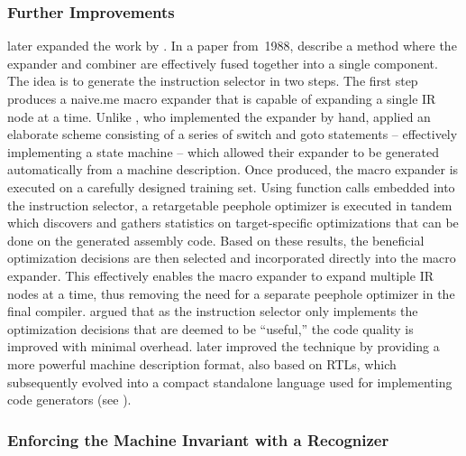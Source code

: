 \subsubsection{Further Improvements}

\textcite{FraserWendt:1988} later expanded the work by
\citeauthor{DavidsonFraser:1984}.
%
In a paper from~1988, \citeauthor{FraserWendt:1988} describe a method where the
\gls{expander} and \gls{combiner} are effectively fused together into a single
component.
%
The idea is to generate the \gls{instruction selector} in two steps.
%
The first step produces a \gls{naive.me} \gls{macro expander} that is capable of
expanding a single \gls{IR} \gls{node} at a time.
%
Unlike \citeauthor{DavidsonFraser:1984}, who implemented the \gls{expander} by
hand, \citeauthor{FraserWendt:1988} applied an elaborate scheme consisting of a
series of switch and goto statements -- effectively implementing a \gls{state
  machine} -- which allowed their \gls{expander} to be generated automatically
from a \gls{machine description}.
%
Once produced, the \gls{macro expander} is executed on a carefully designed
training set.
%
Using function calls embedded into the \gls{instruction selector}, a
retargetable \gls{peephole optimizer} is executed in tandem which discovers and
gathers statistics on target-specific optimizations that can be done on the
generated \gls{assembly code}.
%
Based on these results, the beneficial optimization decisions are then selected
and incorporated directly into the \gls{macro expander}.
%
This effectively enables the \gls{macro expander} to expand multiple \gls{IR}
\glspl{node} at a time, thus removing the need for a separate \gls{peephole
  optimizer} in the final \gls{compiler}.
%
\citeauthor{FraserWendt:1988} argued that as the \gls{instruction selector} only
implements the optimization decisions that are deemed to be ``useful,'' the code
quality is improved with minimal overhead.
%
\textcite{Wendt:1990} later improved the technique by providing a more powerful
\gls{machine description} format, also based on \glspl{RTL}, which subsequently
evolved into a compact standalone language used for implementing \glspl{code
  generator} (see \textcite{Fraser:1989}).


\subsubsection{Enforcing the Machine Invariant with a Recognizer}

